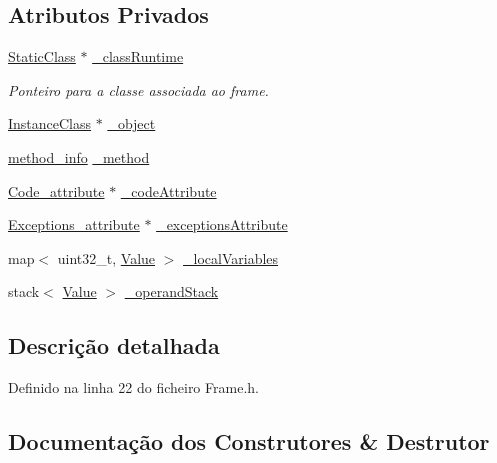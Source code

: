 \subsection*{Atributos Privados}
\begin{DoxyCompactItemize}
\item 
\hyperlink{classStaticClass}{Static\+Class} $\ast$ \hyperlink{classFrame_aa6f380f48c5bac83780daed06dc04f9e}{\+\_\+class\+Runtime}
\begin{DoxyCompactList}\small\item\em Ponteiro para a classe associada ao frame. \end{DoxyCompactList}\item 
\hyperlink{classInstanceClass}{Instance\+Class} $\ast$ \hyperlink{classFrame_a618b0873a50306f7805ea09685e8eee9}{\+\_\+object}
\item 
\hyperlink{structmethod__info}{method\+\_\+info} \hyperlink{classFrame_af9658f71efb91988fa39a224ce9ec9c6}{\+\_\+method}
\item 
\hyperlink{structCode__attribute}{Code\+\_\+attribute} $\ast$ \hyperlink{classFrame_a0b7e80617513d7c1879e20510622103d}{\+\_\+code\+Attribute}
\item 
\hyperlink{structExceptions__attribute}{Exceptions\+\_\+attribute} $\ast$ \hyperlink{classFrame_a5e98b7eb6642b16c03a75ec1f96c4fc4}{\+\_\+exceptions\+Attribute}
\item 
map$<$ uint32\+\_\+t, \hyperlink{structValue}{Value} $>$ \hyperlink{classFrame_af9a215cbac749f3f51e1e7fe239f2010}{\+\_\+local\+Variables}
\item 
stack$<$ \hyperlink{structValue}{Value} $>$ \hyperlink{classFrame_abb8b7f1997e7f3da06d6b0f9aaf61ab2}{\+\_\+operand\+Stack}
\end{DoxyCompactItemize}


\subsection{Descrição detalhada}


Definido na linha 22 do ficheiro Frame.\+h.



\subsection{Documentação dos Construtores \& Destrutor}
\mbox{\label{classFrame_a3318a2cfd762b3a31adc4f101cb006e6}} 
